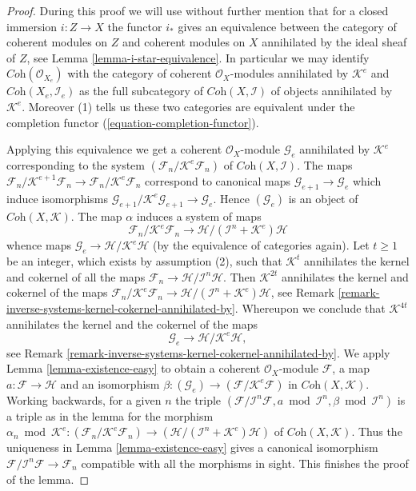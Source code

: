 \begin{proof}
During this proof we will use without further mention that for a closed
immersion $i : Z \to X$ the functor $i_*$ gives an equivalence between the
category of coherent modules on $Z$ and coherent modules on $X$ annihilated
by the ideal sheaf of $Z$, see Lemma \ref{lemma-i-star-equivalence}.
In particular we may identify $\textit{Coh}(\mathcal{O}_{X_e})$
with the category of coherent $\mathcal{O}_X$-modules annihilated by
$\mathcal{K}^e$ and $\textit{Coh}(X_e, \mathcal{I}_e)$ as the full subcategory
of $\textit{Coh}(X, \mathcal{I})$ of objects annihilated by $\mathcal{K}^e$.
Moreover (1) tells us these two categories are equivalent under the
completion functor (\ref{equation-completion-functor}).

\medskip\noindent
Applying this equivalence we get a coherent $\mathcal{O}_X$-module
$\mathcal{G}_e$ annihilated by $\mathcal{K}^e$ corresponding to the system
$(\mathcal{F}_n/\mathcal{K}^e\mathcal{F}_n)$ of
$\textit{Coh}(X, \mathcal{I})$. The maps
$\mathcal{F}_n/\mathcal{K}^{e + 1}\mathcal{F}_n \to
\mathcal{F}_n/\mathcal{K}^e\mathcal{F}_n$ correspond to canonical maps
$\mathcal{G}_{e + 1} \to \mathcal{G}_e$ which induce isomorphisms
$\mathcal{G}_{e + 1}/\mathcal{K}^e\mathcal{G}_{e + 1} \to \mathcal{G}_e$.
Hence $(\mathcal{G}_e)$ is an object of $\textit{Coh}(X, \mathcal{K})$.
The map $\alpha$ induces a system of maps
$$
\mathcal{F}_n/\mathcal{K}^e\mathcal{F}_n
\longrightarrow
\mathcal{H}/(\mathcal{I}^n + \mathcal{K}^e)\mathcal{H}
$$
whence maps $\mathcal{G}_e \to \mathcal{H}/\mathcal{K}^e\mathcal{H}$
(by the equivalence of categories again).
Let $t \geq 1$ be an integer, which exists by assumption (2),
such that $\mathcal{K}^t$ annihilates the kernel and cokernel of all the maps
$\mathcal{F}_n \to \mathcal{H}/\mathcal{I}^n\mathcal{H}$.
Then $\mathcal{K}^{2t}$ annihilates the kernel and cokernel of the maps
$\mathcal{F}_n/\mathcal{K}^e\mathcal{F}_n \to
\mathcal{H}/(\mathcal{I}^n + \mathcal{K}^e)\mathcal{H}$, see
Remark \ref{remark-inverse-systems-kernel-cokernel-annihilated-by}.
Whereupon we conclude that $\mathcal{K}^{4t}$ annihilates the kernel and
the cokernel of the maps
$$
\mathcal{G}_e
\longrightarrow
\mathcal{H}/\mathcal{K}^e\mathcal{H},
$$
see Remark \ref{remark-inverse-systems-kernel-cokernel-annihilated-by}.
We apply Lemma \ref{lemma-existence-easy} to obtain a coherent
$\mathcal{O}_X$-module $\mathcal{F}$, a map
$a : \mathcal{F} \to \mathcal{H}$ and an isomorphism
$\beta : (\mathcal{G}_e) \to (\mathcal{F}/\mathcal{K}^e\mathcal{F})$
in $\textit{Coh}(X, \mathcal{K})$. Working backwards, for a given $n$
the triple
$(\mathcal{F}/\mathcal{I}^n\mathcal{F}, a \bmod \mathcal{I}^n, \beta
\bmod \mathcal{I}^n)$ is a triple as in the lemma for the morphism
$\alpha_n \bmod \mathcal{K}^e :
(\mathcal{F}_n/\mathcal{K}^e\mathcal{F}_n) \to
(\mathcal{H}/(\mathcal{I}^n + \mathcal{K}^e)\mathcal{H})$
of $\textit{Coh}(X, \mathcal{K})$. Thus the uniqueness in
Lemma \ref{lemma-existence-easy}
gives a canonical isomorphism
$\mathcal{F}/\mathcal{I}^n\mathcal{F} \to \mathcal{F}_n$
compatible with all the morphisms in sight. This finishes the proof
of the lemma.
\end{proof}

